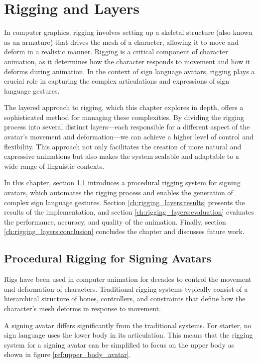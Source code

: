\documentclass[../../main.tex]{subfiles}
\begin{document}
\chapter{Rigging and Layers}
\label{ch:rigging_layers}

In computer graphics, rigging involves setting up a skeletal structure (also known as an armature) that drives the mesh of a character, allowing it to move and deform in a realistic manner. Rigging is a critical component of character animation, as it determines how the character responds to movement and how it deforms during animation. In the context of sign language avatars, rigging plays a crucial role in capturing the complex articulations and expressions of sign language gestures.

The layered approach to rigging, which this chapter explores in depth, offers a sophisticated method for managing these complexities. By dividing the rigging process into several distinct layers—each responsible for a different aspect of the avatar’s movement and deformation—we can achieve a higher level of control and flexibility. This approach not only facilitates the creation of more natural and expressive animations but also makes the system scalable and adaptable to a wide range of linguistic contexts.

In this chapter, section \ref{ch:rigging_layers:proc_rig_signing_avatars} introduces a procedural rigging system for signing avatars, which automates the rigging process and enables the generation of complex sign language gestures. Section \ref{ch:rigging_layers:results} presents the results of the implementation, and section \ref{ch:rigging_layers:evaluation} evaluates the performance, accuracy, and quality of the animation. Finally, section \ref{ch:rigging_layers:conclusion} concludes the chapter and discusses future work.

\section{Procedural Rigging for Signing Avatars}
\label{ch:rigging_layers:proc_rig_signing_avatars}

Rigs have been used in computer animation for decades to control the movement and deformation of characters. Traditional rigging systems typically consist of a hierarchical structure of bones, controllers, and constraints that define how the character’s mesh deforms in response to movement.

A signing avatar differs significantly from the traditional systems. For starter, no sign language uses the lower body in its articulation. This means that the rigging system for a signing avatar can be simplified to focus on the upper body as shown in figure \ref{ref:upper_body_avatar}. 
\end{document}
